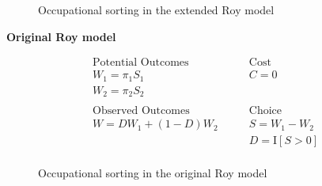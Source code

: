 \begin{frame}
	\begin{figure}[htp]\centering
		\caption{Occupational sorting in the extended Roy model}
	\end{figure}
\end{frame}
\begin{frame}
	\textbf{Original Roy model}

	\begin{align*}
	\text{Potential Outcomes} &\qquad \text{Cost} \\
	W_1 = \pi_1 S_1      &\qquad C = 0 \\
	W_2 = \pi_2 S_2       &\qquad \\
	& \\
	\text{Observed Outcomes } &\qquad \text{Choice} \\
	W = D W_1 + (1 - D)W_2 &\qquad S = W_1 - W_2 \\
	&\qquad D = \mathrm{I}[S > 0] \\
	\end{align*}
\end{frame}
\begin{frame}
	\begin{figure}[htp]\centering
		\caption{Occupational sorting in the original Roy model}
	\end{figure}
\end{frame}
